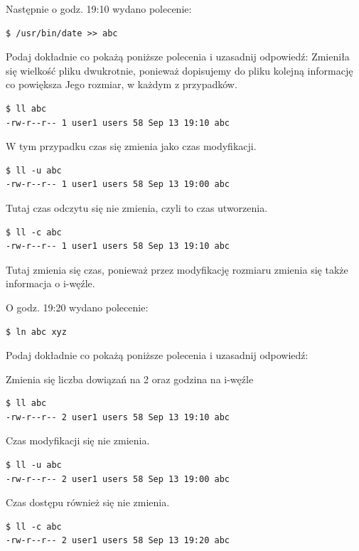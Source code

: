 \documentclass[11pt]{article}
\begin{document}
Następnie o godz. 19:10 wydano polecenie:

\begin{verbatim}
$ /usr/bin/date >> abc
\end{verbatim}


Podaj dokładnie co pokażą poniższe polecenia i uzasadnij odpowiedź:
Zmieniła się wielkość pliku dwukrotnie, ponieważ dopisujemy do
pliku kolejną informację co powiększa Jego rozmiar, w każdym z
przypadków.


\begin{verbatim}
$ ll abc
-rw-r--r-- 1 user1 users 58 Sep 13 19:10 abc
\end{verbatim}


W tym przypadku czas się zmienia jako czas
modyfikacji.


\begin{verbatim}
$ ll -u abc
-rw-r--r-- 1 user1 users 58 Sep 13 19:00 abc
\end{verbatim}

Tutaj czas odczytu się nie zmienia, czyli to czas utworzenia.


\begin{verbatim}
$ ll -c abc
-rw-r--r-- 1 user1 users 58 Sep 13 19:10 abc
\end{verbatim}


Tutaj zmienia się czas, ponieważ przez modyfikację rozmiaru
zmienia się także informacja o i-węźle.


O godz. 19:20 wydano polecenie:

\begin{verbatim}
$ ln abc xyz
\end{verbatim}


Podaj dokładnie co pokażą poniższe polecenia i uzasadnij odpowiedź:

Zmienia się liczba dowiązań na 2 oraz godzina na i-węźle


\begin{verbatim}
$ ll abc
-rw-r--r-- 2 user1 users 58 Sep 13 19:10 abc
\end{verbatim}


Czas modyfikacji się nie zmienia.


\begin{verbatim}
$ ll -u abc
-rw-r--r-- 2 user1 users 58 Sep 13 19:00 abc
\end{verbatim}


Czas dostępu również się nie zmienia.

\begin{verbatim}
$ ll -c abc
-rw-r--r-- 2 user1 users 58 Sep 13 19:20 abc
\end{verbatim}
\end{document}
